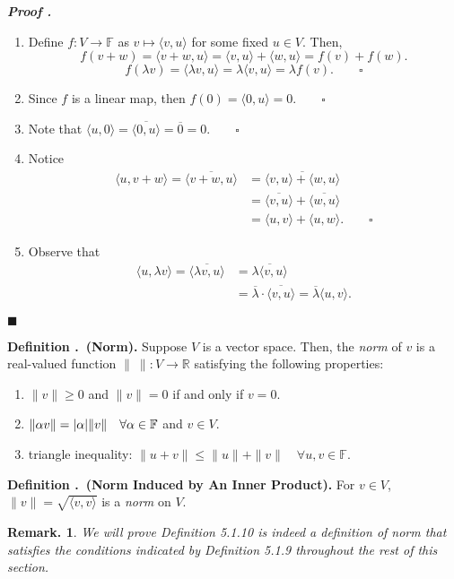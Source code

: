 \documentclass[11pt, letterpaper]{article}
\newcounter{index}[subsection]
\newenvironment*{df}[1]{\par\noindent\textbf{Definition \thesubsection.\stepcounter{index}\theindex\ (#1).}}{\par}
\newcounter{nprf}[subsection]
\newenvironment*{prf}{\par\indent\textbf{\textit{Proof \stepcounter{nprf}\thenprf.}}}{\hfill$\blacksquare$\par}
\newtheorem*{rmk}{Remark.}
\def\R{\mathbb{R}}
\def\F{\mathbb{F}}
\def\pqde{\qquad\square}
\begin{document}
\begin{prf}
	\begin{enumerate}
		\item Define $f: V\to\F$ as $v\mapsto\langle v,u\rangle$ for some fixed $u\in V$. Then, \[f(v+w)=\langle v+w,u\rangle=\langle v,u\rangle+\langle w,u\rangle=f(v)+f(w).\] \[f(\lambda v)=\langle\lambda v,u\rangle=\lambda\langle v,u\rangle=\lambda f(v).\pqde\]
		\item Since $f$ is a linear map, then $f(0)=\langle 0,u\rangle=0.\pqde$
		\item Note that $\langle u,0\rangle=\overline{\langle 0,u\rangle}=\overline{0}=0.\pqde$
		\item Notice \[\begin{aligned}\langle u, v+w\rangle=\overline{\langle v+w, u\rangle}&=\overline{\langle v,u\rangle+\langle w,u\rangle}\\&=\overline{\langle v,u\rangle}+\overline{\langle w,u\rangle}\\&=\langle u,v\rangle+\langle u,w\rangle.\pqde\end{aligned}\]
		\item Observe that \[\begin{aligned}\langle u,\lambda v\rangle=\overline{\langle\lambda v,u\rangle}&=\overline{\lambda\langle v,u\rangle}\\&=\overline{\lambda}\cdot\overline{\langle v,u\rangle}=\overline{\lambda}\langle u,v\rangle.\end{aligned}\]
	\end{enumerate}	
\end{prf}
\begin{df}{Norm}
	Suppose $V$ is a vector space. Then, the \textit{norm} of $v$ is a real-valued function $\|\ \|:V\to\R$ satisfying the following properties: 
	\begin{enumerate}
		\item $\|v\|\geq0$ and $\|v\|=0$ if and only if $v=0$.
		\item $\|\alpha v\|=\qty|\alpha|\|v\|\quad\forall\alpha\in\F$ and $v\in V.$
		\item triangle inequality: $\|u+v\|\leq\|u\|+\|v\|\quad\forall u,v\in\F$.
	\end{enumerate}	
\end{df}
\begin{df}{Norm Induced by An Inner Product}
	For $v\in V$, $\|v\|=\sqrt{\langle v,v\rangle}$ is a \textit{norm} on $V$.	
\end{df}
\begin{rmk}
	We will prove Definition 5.1.10 is indeed a definition of norm that satisfies the conditions indicated by Definition 5.1.9 throughout the rest of this section.
\end{rmk}
\end{document}

